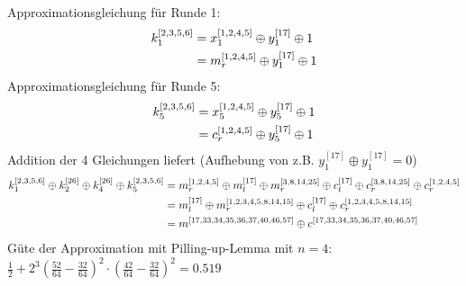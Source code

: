 \documentclass{article}
\begin{document}
\begin{enumerate}[label=(\alph*)]
		Approximationsgleichung für Runde 1:
		\begin{align}
			k_1^{[2,3,5,6]} &= x_1^{[1,2,4,5]} \oplus y_1^{[17]} \oplus 1 \notag \\
			&= m_r^{[1,2,4,5]} \oplus y_1^{[17]} \oplus 1 \notag
		\end{align}
		Approximationsgleichung für Runde 5:
		\begin{align}
			k_5^{[2,3,5,6]} &= x_5^{[1,2,4,5]} \oplus y_5^{[17]} \oplus 1 \notag \\
			&= c_r^{[1,2,4,5]} \oplus y_5^{[17]} \oplus 1 \notag
		\end{align}
		Addition der 4 Gleichungen liefert (Aufhebung von z.B. $y_1^{[17]} \oplus y_1^{[17]} = 0$)
		\begin{align}
			k_1^{[2,3,5,6]} \oplus k_2^{[26]} \oplus k_4^{[26]} \oplus k_5^{[2,3,5,6]} &= m_r^{[1,2,4,5]} \oplus m_l^{[17]} \oplus m_r^{[3,8,14,25]} \oplus c_l^{[17]} \oplus c_r^{[3,8,14,25]} \oplus c_r^{[1,2,4,5]} \notag \\
			&= m_l^{[17]} \oplus m_r^{[1,2,3,4,5,8,14,15]} \oplus c_l^{[17]} \oplus c_r^{[1,2,3,4,5,8,14,15]} \notag \\
			&= m^{[17,33,34,35,36,37,40,46,57]} \oplus c^{[17,33,34,35,36,37,40,46,57]} \notag
		\end{align}
		Güte der Approximation mit Pilling-up-Lemma mit $n=4$: $\frac{1}{2} + 2^3\left(\frac{52}{64} - \frac{32}{64}\right)^2\cdot\left(\frac{42}{64} - \frac{32}{64}\right)^2 = 0.519$ 
	\end{enumerate}
\end{document}
